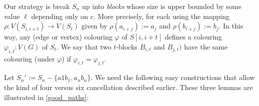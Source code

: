 \documentclass{patmorin}
\begin{document}
%
%
%
%
%
%
%
%
%
%
%
%
%
%

%

Our strategy is break $S_n$ up into \emph{blocks} whose size is upper bounded by some value $\ell$ depending only on $c$. More precisely, for each  using the mapping $\rho:V(S_{i,i+t})\to V(S_t)$ given by $\rho(a_{i+j}):=a_{j}$ and $\rho(b_{i+j}):=b_{j}$.  In this way, any (edge or vertex) colouring $\varphi$ of $S[i,i+t]$ defines a colouring $\varphi_{i,t}:V(G)$ of $S_t$.  We say that two $t$-blocks $B_{i,t}$ and $B_{j,t})$ have the same colouring (under $\varphi$) if $\varphi_{i,t}=\varphi_{j,t}$.

Let $S_n':=S_n-\{a1b_1,a_nb_n\}$. We need the following easy constructions that allow the kind of four versus six cancellation described earlier.  These three lemmas are illustrated in \cref{good_paths}:
\end{document}

